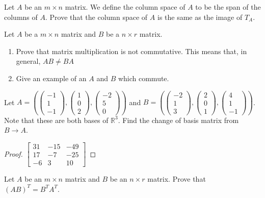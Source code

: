 \begin{exercise}
    Let $A$ be an $m\times n$ matrix. We define the column space of $A$ to be the span of the columns of $A$. Prove that the column space of $A$ is the same as the image of $T_A$.
\end{exercise}
\begin{exercise}
    Let $A$ be a $m\times n$ matrix and $B$ be a $n\times r$ matrix.
    \begin{enumerate}[label=(\alph*)]
        \item Prove that matrix multiplication is not commutative. This means that, in general, $AB\neq BA$
        \item Give an example of an $A$ and $B$ which commute.
    \end{enumerate}
\end{exercise}
\begin{exercise}
    Let $A=\left(\begin{pmatrix}
        -1 \\ 1 \\ -1
    \end{pmatrix}, \begin{pmatrix}
        1 \\ 0 \\ 2
    \end{pmatrix}, \begin{pmatrix}
        -2 \\ 5 \\ 0
    \end{pmatrix}\right)$ and $B=\left(\begin{pmatrix}
        -2 \\ 1 \\ 3
    \end{pmatrix}, \begin{pmatrix}
        2 \\ 0 \\ 1
    \end{pmatrix}, \begin{pmatrix}
        4 \\ 1 \\ -1
    \end{pmatrix}\right)$. Note that these are both bases of $\mathbb{R}^3$. Find the change of basis matrix from $B\to A$.
\end{exercise}
\begin{proof}
    $\begin{bmatrix}
        31 & -15 & -49 \\
        17 & -7 & -25 \\
        -6 & 3 & 10
    \end{bmatrix}$
\end{proof}
\begin{exercise}
    Let $A$ be an $m\times n$ matrix and $B$ be an $n\times r$ matrix. Prove that $(AB)^T=B^TA^T$.
\end{exercise}
